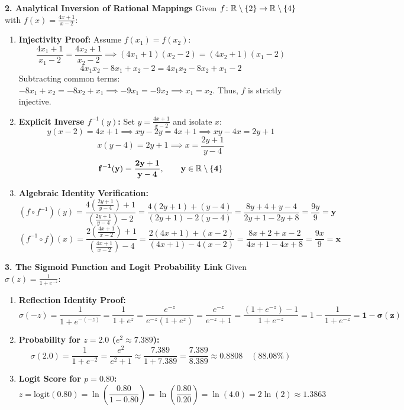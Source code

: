 \textbf{2. Analytical Inversion of Rational Mappings}
Given $f \colon \mathbb{R} \setminus \{2\} \to \mathbb{R} \setminus \{4\}$ with $f(x) = \frac{4x + 1}{x - 2}$:
\begin{enumerate}
    \item \textbf{Injectivity Proof:}
    Assume $f(x_1) = f(x_2)$:
    $$\frac{4x_1 + 1}{x_1 - 2} = \frac{4x_2 + 1}{x_2 - 2} \implies (4x_1 + 1)(x_2 - 2) = (4x_2 + 1)(x_1 - 2)$$
    $$4x_1 x_2 - 8x_1 + x_2 - 2 = 4x_1 x_2 - 8x_2 + x_1 - 2$$
    Subtracting common terms: $-8x_1 + x_2 = -8x_2 + x_1 \implies -9x_1 = -9x_2 \implies x_1 = x_2$.
    Thus, $f$ is strictly injective.
    \item \textbf{Explicit Inverse $f^{-1}(y)$:}
    Set $y = \frac{4x + 1}{x - 2}$ and isolate $x$:
    $$y(x - 2) = 4x + 1 \implies xy - 2y = 4x + 1 \implies xy - 4x = 2y + 1$$
    $$x(y - 4) = 2y + 1 \implies x = \frac{2y + 1}{y - 4}$$
    $$\mathbf{f^{-1}(y) = \frac{2y + 1}{y - 4}, \qquad y \in \mathbb{R} \setminus \{4\}}$$
    \item \textbf{Algebraic Identity Verification:}
    $$(f \circ f^{-1})(y) = \frac{4\left(\frac{2y+1}{y-4}\right) + 1}{\left(\frac{2y+1}{y-4}\right) - 2} = \frac{4(2y+1) + (y-4)}{(2y+1) - 2(y-4)} = \frac{8y + 4 + y - 4}{2y + 1 - 2y + 8} = \frac{9y}{9} = \mathbf{y}$$
    $$(f^{-1} \circ f)(x) = \frac{2\left(\frac{4x+1}{x-2}\right) + 1}{\left(\frac{4x+1}{x-2}\right) - 4} = \frac{2(4x+1) + (x-2)}{(4x+1) - 4(x-2)} = \frac{8x + 2 + x - 2}{4x + 1 - 4x + 8} = \frac{9x}{9} = \mathbf{x}$$
\end{enumerate}

\textbf{3. The Sigmoid Function and Logit Probability Link}
Given $\sigma(z) = \frac{1}{1 + e^{-z}}$:
\begin{enumerate}
    \item \textbf{Reflection Identity Proof:}
    $$\sigma(-z) = \frac{1}{1 + e^{-(-z)}} = \frac{1}{1 + e^z} = \frac{e^{-z}}{e^{-z}(1 + e^z)} = \frac{e^{-z}}{e^{-z} + 1} = \frac{(1 + e^{-z}) - 1}{1 + e^{-z}} = 1 - \frac{1}{1 + e^{-z}} = \mathbf{1 - \sigma(z)}$$
    \item \textbf{Probability for $z = 2.0$ ($e^2 \approx 7.389$):}
    $$\sigma(2.0) = \frac{1}{1 + e^{-2}} = \frac{e^2}{e^2 + 1} \approx \frac{7.389}{1 + 7.389} = \frac{7.389}{8.389} \approx \mathbf{0.8808 \quad (88.08\%)}$$
    \item \textbf{Logit Score for $p = 0.80$:}
    $$z = \text{logit}(0.80) = \ln\left( \frac{0.80}{1 - 0.80} \right) = \ln\left( \frac{0.80}{0.20} \right) = \ln(4.0) = 2 \ln(2) \approx \mathbf{1.3863}$$
\end{enumerate}

